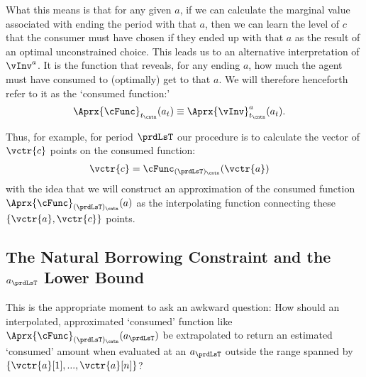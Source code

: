 \documentclass[SolvingMicroDSOPs]{subfiles}
\begin{document}
What this means is that for any given $a$, if we can calculate the marginal value associated with ending the period with that $a$, then we can learn the level of $c$ that the consumer must have chosen if they ended up with that $a$ as the result of an optimal unconstrained choice.  This leads us to an alternative interpretation of $\vInv^{a}$. It is the function that reveals, for any ending $a$, how much the agent must have consumed to (optimally) get to that $a$.  We will therefore henceforth refer to it as the `consumed function:'
\begin{equation}\begin{gathered}\begin{aligned}
      \Aprx{\cFunc}_{\prd_\cntn}(a_{\prd}) & \equiv \Aprx{\vInv}^{a}_{\prd_\cntn}(a_{\prd}) \label{eq:consumedfn}.    
    \end{aligned}\end{gathered}\end{equation}

Thus, for example, for period $\prdLsT$ our procedure is to calculate the vector of $\vctr{c}$ points on the consumed function:
\begin{equation}\begin{gathered}\begin{aligned}
      \vctr{c} & = \cFunc_{(\prdLsT)_\cntn}(\vctr{a}) \label{eq:consumedfnvecs}     
    \end{aligned}\end{gathered}\end{equation}
with the idea that we will construct an approximation of the consumed function $\Aprx{\cFunc}_{(\prdLsT)_\cntn}(\aNrm)$ as the interpolating function connecting these $\{\vctr{a},\vctr{c}\}$ points.

\hypertarget{the-natural-borrowing-constraint-and-the-a-lower-bound}{}
\subsection{The Natural Borrowing Constraint and the $a_{\prdLsT}$ Lower Bound} \label{subsec:LiqConstrSelfImposed}

This is the appropriate moment to ask an awkward question: How should an interpolated, approximated `consumed' function like $\Aprx{\cFunc}_{(\prdLsT)_\cntn}(a_{\prdLsT})$ be extrapolated to return an estimated `consumed' amount when evaluated at an $a_{\prdLsT}$ outside the range spanned by $\{\vctr{a}[1],...,\vctr{a}[n]\}$?
\end{document}
